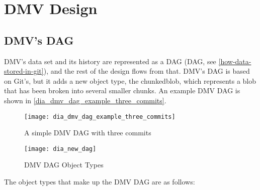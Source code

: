 \chapter{DMV Design}


\section{DMV's DAG}

\gls{DMV}'s data set and its history are represented as a \acrshort{DAG}
(\acrlong{DAG}, see \autoref{how-data-stored-in-git}), and the rest of the
design flows from that. \gls{DMV}'s \gls{DAG} is based on Git's, but it adds a
new object type, the \gls{chunkedblob}, which represents a \gls{blob} that has
been broken into several smaller chunks. An example \gls{DMV} \gls{DAG} is shown
in \autoref{dia_dmv_dag_example_three_commits}.

\begin{figure}[p]
    \centering
    \texttt{[image: dia\_dmv\_dag\_example\_three\_commits]}
    \caption{A simple DMV DAG with three commits}
    \label{dia_dmv_dag_example_three_commits}
\end{figure}

\begin{figure}[p]
    \centering
        \texttt{[image: dia\_new\_dag]}
    \caption{DMV DAG Object Types}
    \label{fig:dia_new_dag}
\end{figure}

The object types that make up the \gls{DMV} \gls{DAG} are as follows:


